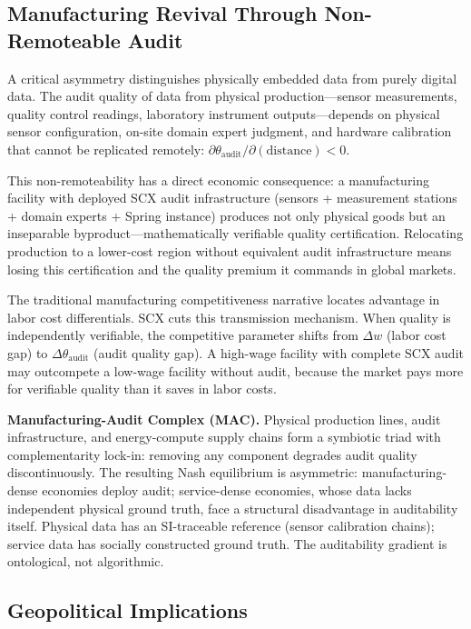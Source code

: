 \documentclass[twocolumn]{article}
\theoremstyle{definition}
\begin{document}
\subsection{Manufacturing Revival Through Non-Remoteable Audit}

A critical asymmetry distinguishes physically embedded data from purely digital data. The audit quality of data from physical production---sensor measurements, quality control readings, laboratory instrument outputs---depends on physical sensor configuration, on-site domain expert judgment, and hardware calibration that cannot be replicated remotely: $\partial \theta_{\text{audit}} / \partial(\text{distance}) < 0$.

This non-remoteability has a direct economic consequence: a manufacturing facility with deployed SCX audit infrastructure (sensors + measurement stations + domain experts + Spring instance) produces not only physical goods but an inseparable byproduct---mathematically verifiable quality certification. Relocating production to a lower-cost region without equivalent audit infrastructure means losing this certification and the quality premium it commands in global markets.

The traditional manufacturing competitiveness narrative locates advantage in labor cost differentials. SCX cuts this transmission mechanism. When quality is independently verifiable, the competitive parameter shifts from $\Delta w$ (labor cost gap) to $\Delta \theta_{\text{audit}}$ (audit quality gap). A high-wage facility with complete SCX audit may outcompete a low-wage facility without audit, because the market pays more for verifiable quality than it saves in labor costs.

\textbf{Manufacturing-Audit Complex (MAC).} Physical production lines, audit infrastructure, and energy-compute supply chains form a symbiotic triad with complementarity lock-in: removing any component degrades audit quality discontinuously. The resulting Nash equilibrium is asymmetric: manufacturing-dense economies deploy audit; service-dense economies, whose data lacks independent physical ground truth, face a structural disadvantage in auditability itself. Physical data has an SI-traceable reference (sensor calibration chains); service data has socially constructed ground truth. The auditability gradient is ontological, not algorithmic.

\subsection{Geopolitical Implications}
\end{document}
